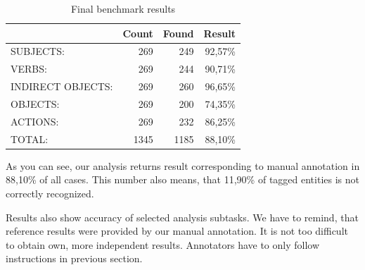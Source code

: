 \begin{table}[ht]   %
\begin{center}
\begin{tabular}{l r r r}
 & Count & Found & Result \\
\hline
SUBJECTS: & 269 & 249 & 92,57\% \\
VERBS: & 269 & 244 & 90,71\% \\
INDIRECT OBJECTS:& 269 & 260 & 96,65\% \\   
OBJECTS: & 269 & 200 & 74,35\% \\
ACTIONS: & 269 & 232 & 86,25\% \\
\hline
TOTAL: & 1345 & 1185 & 88,10\% \\
\hline
\end{tabular}

  \caption{Final benchmark results}
  \label{tab.benchmarkresults}
\end{center}
\end{table}    
 
As you can see, our analysis returns result corresponding to manual annotation in 88,10\% of all cases. This number also means, that 11,90\% of tagged entities is not correctly recognized.

Results also show accuracy of selected analysis subtasks. We have to remind, that reference results were provided by our manual annotation. It is not too difficult to obtain own, more independent results. Annotators have to only follow instructions in previous section.


